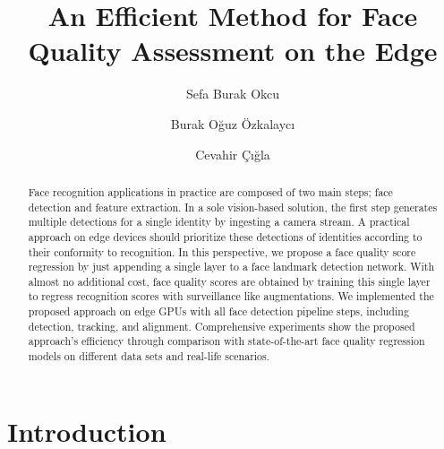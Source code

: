 \documentclass[runningheads]{llncs}
\begin{document}
\pagestyle{headings}
\mainmatter
\def\ECCVSubNumber{11}  

\title{An Efficient Method for Face Quality Assessment on the Edge
       } 

\begin{comment}
\titlerunning{ECCV-20 submission ID \ECCVSubNumber} 
\authorrunning{ECCV-20 submission ID \ECCVSubNumber} 
\author{Anonymous ECCV submission}
\institute{Paper ID \ECCVSubNumber}
\end{comment}


\author{Sefa Burak Okcu  \and
Burak Oğuz Özkalaycı \and
Cevahir Çığla }
\maketitle

\begin{abstract}
Face recognition applications in practice are composed of two main steps; face detection and feature extraction. In a sole vision-based solution, the first step generates multiple detections for a single identity by ingesting a camera stream. A practical approach on edge devices should prioritize these detections of identities according to their conformity to recognition. In this perspective, we propose a face quality score regression by just appending a single layer to a face landmark detection network. With almost no additional cost, face quality scores are obtained by training this single layer to regress recognition scores with surveillance like augmentations. We implemented the proposed approach on edge GPUs with all face detection pipeline steps, including detection, tracking, and alignment. Comprehensive experiments show the proposed approach’s efficiency through comparison with state-of-the-art face quality regression models on different data sets and real-life scenarios. 

\end{abstract}


\section{Introduction}
 
\end{document}
